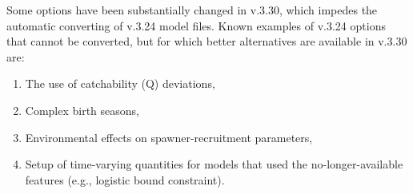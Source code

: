 \noindent Some options have been substantially changed in v.3.30, which impedes the automatic converting of v.3.24 model files. Known examples of v.3.24 options that cannot be converted, but for which better alternatives are available in v.3.30 are:
\begin{enumerate}
	\item The use of catchability (Q) deviations,
	\item Complex birth seasons,
	\item Environmental effects on spawner-recruitment parameters,
	\item Setup of time-varying quantities for models that used the no-longer-available features (e.g., logistic bound constraint).
\end{enumerate}

\pagebreak
